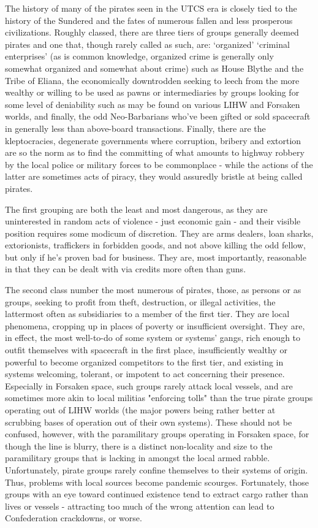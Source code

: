 The history of many of the pirates seen in the UTCS era is closely
tied to the history of the Sundered and the fates of numerous fallen
and less prosperous civilizations. Roughly classed, there are three
tiers of groups generally deemed pirates and one that, though rarely
called as such, are: `organized' `criminal enterprises' (as is common
knowledge, organized crime is generally only somewhat organized and
somewhat about crime) such as House Blythe and the Tribe of Eliana,
the economically downtrodden seeking to leech from the more wealthy or
willing to be used as pawns or intermediaries by groups looking for
some level of deniability such as may be found on various LIHW and
Forsaken worlds, and finally, the odd Neo-Barbarians who've been
gifted or sold spacecraft in generally less than above-board
transactions.  Finally, there are the kleptocracies, degenerate
governments where corruption, bribery and extortion are so the norm as
to find the committing of what amounts to highway robbery by the local
police or military forces to be commonplace - while the actions of the
latter are sometimes acts of piracy, they would assuredly bristle at
being called pirates.

The first grouping are both the least and most dangerous, as they are
uninterested in random acts of violence - just economic gain - and
their visible position requires some modicum of discretion. They are
arms dealers, loan sharks, extorionists, traffickers in forbidden
goods, and not above killing the odd fellow, but only if he's proven
bad for business.  They are, most importantly, reasonable in that they
can be dealt with via credits more often than guns.

The second class number the most numerous of pirates, those, as
persons or as groups, seeking to profit from theft, destruction, or
illegal activities, the lattermost often as subsidiaries to a member
of the first tier. They are local phenomena, cropping up in places of
poverty or insufficient oversight. They are, in effect, the most
well-to-do of some system or systems' gangs, rich enough to outfit
themselves with spacecraft in the first place, insufficiently wealthy
or powerful to become organized competitors to the first tier, and
existing in systems welcoming, tolerant, or impotent to act concerning
their presence. Especially in Forsaken space, such groups rarely
attack local vessels, and are sometimes more akin to local militias
"enforcing tolls" than the true pirate groups operating out of LIHW
worlds (the major powers being rather better at scrubbing bases of
operation out of their own systems). These should not be confused,
however, with the paramilitary groups operating in Forsaken space, for
though the line is blurry, there is a distinct non-locality and size
to the paramilitary groups that is lacking in amongst the local armed
rabble. Unfortunately, pirate groups rarely confine themselves to
their systems of origin. Thus, problems with local sources become
pandemic scourges. Fortunately, those groups with an eye toward
continued existence tend to extract cargo rather than lives or vessels
- attracting too much of the wrong attention can lead to Confederation
crackdowns, or worse.

